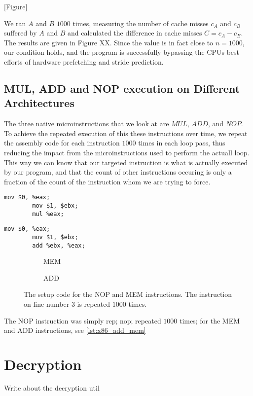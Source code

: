[Figure] 

We ran \(A\) and \(B\) \(1000\) times, measuring the number of cache misses \(c_A\) and \(c_B\) suffered by \(A\) and \(B\) and calculated the difference in cache misses \(C = c_A - c_B\). 
The results are given in Figure XX. Since the value is in fact close to \(n = 1000\), our condition holds, and the program is successfully bypassing the CPUs best efforts of hardware prefetching and stride prediction.

\subsection{MUL, ADD and NOP execution on Different Architectures}

The three native microinstructions that we look at are \(MUL\), \(ADD\), and \(NOP\). 
To achieve the repeated execution of this these instructions over time, we repeat the assembly code for each instruction \(1000\) times in each loop pass, thus reducing the impact from the microinstructions used to perform the actuall loop. 
This way we can know that our targeted instruction is what is actually executed by our program, and that the count of other instructions occuring is only a fraction of the count of the instruction whom we are trying to force.

\newsavebox{\MEMfigure}
	\begin{lrbox}{\MEMfigure}%
	\begin{lstlisting}[language={[x86masm]Assembler}]
		mov $0, %eax;
		mov $1, $ebx;
		mul %eax;
	\end{lstlisting}
\end{lrbox}

\newsavebox{\ADDfigure}
	\begin{lrbox}{\ADDfigure}%
	\begin{lstlisting}[language={[x86masm]Assembler}]
		mov $0, %eax;
		mov $1, $ebx;
		add %ebx, %eax;
	\end{lstlisting}
\end{lrbox}

\begin{figure}[h]
    \begin{subfigure}{0.5\textwidth}
        \centering
        \usebox{\MEMfigure}
        \caption{MEM}
    \end{subfigure}
    \begin{subfigure}{0.5\textwidth}
        \centering
        \usebox{\ADDfigure}
        \caption{ADD}
    \end{subfigure}
	\caption{The setup code for the NOP and MEM instructions. The instruction on line number 3 is repeated \(1000\) times.}
	\label{lst:x86_add_mem}
\end{figure}

The NOP instruction was simply rep; nop; repeated \(1000\) times; for the MEM and ADD instructions, see \autoref{lst:x86_add_mem} 

\section{Decryption}
Write about the decryption util

